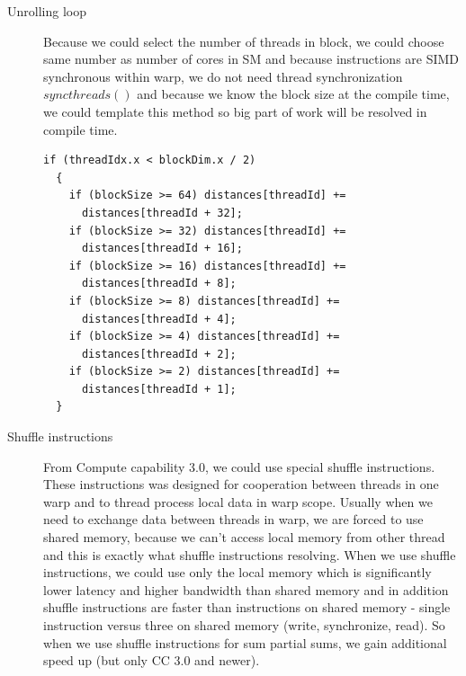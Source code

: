 \begin{description}
\item[Unrolling loop]Because we could select the number of threads in block, we could choose same number as number of cores in SM and because instructions are SIMD synchronous within warp, we do not need thread synchronization $syncthreads()$ and because we know the block size at the compile time, we could template this method so big part of work will be resolved in compile time.
\begin{lstlisting}
if (threadIdx.x < blockDim.x / 2)
  {
    if (blockSize >= 64) distances[threadId] +=
      distances[threadId + 32];
    if (blockSize >= 32) distances[threadId] +=
      distances[threadId + 16];
    if (blockSize >= 16) distances[threadId] +=
      distances[threadId + 8];
    if (blockSize >= 8) distances[threadId] +=
      distances[threadId + 4];
    if (blockSize >= 4) distances[threadId] +=
      distances[threadId + 2];
    if (blockSize >= 2) distances[threadId] +=
      distances[threadId + 1];
  }
\end{lstlisting}
\item[Shuffle instructions]From Compute capability 3.0, we could use special shuffle instructions. These instructions was designed for cooperation between threads in one warp and to thread process local data in warp scope. Usually when we need to exchange data between threads in warp, we are forced to use shared memory, because we can't access local memory from other thread and this is exactly what shuffle instructions resolving. When we use shuffle instructions, we could use only the local memory which is significantly lower latency and higher bandwidth than shared memory and in addition shuffle instructions are faster than instructions on shared memory - single instruction versus three on shared memory (write, synchronize, read). So when we use shuffle instructions for sum partial sums, we gain additional speed up (but only CC 3.0 and newer).
\end{description}

